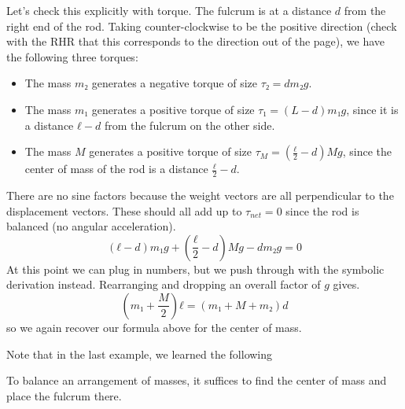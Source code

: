 \begin{example}
\begin{solution}
Let's check this explicitly with torque. The fulcrum is at a distance $d$ from the right end of the rod. Taking counter-clockwise to be the positive direction (check with the RHR that this corresponds to the direction out of the page), we have the following three torques:
\begin{itemize}
	\item The mass $m₂$ generates a negative torque of size $τ₂  = d m₂ g$. 
	\item The mass $m₁$ generates a positive torque of size $τ₁  = (L-d) m₁  g$, since it is a distance $ℓ-d$ from the fulcrum on the other side. 
	\item The mass $M$ generates a positive torque of size $τ_M  = \left(\frac ℓ2-d\right)  M  g$, since the center of mass of the rod is a distance $\frac ℓ2-d$.
\end{itemize}
There are no sine factors because the weight vectors are all perpendicular to the displacement vectors. These should all add up to $τ_{net} = 0$ since the rod is balanced (no angular acceleration).
$$
 (ℓ-d) m₁  g + \left(\frac ℓ2-d\right)  M  g- d m₂ g = 0
$$
At this point we can plug in numbers, but we push through with the symbolic derivation instead. Rearranging and dropping an overall factor of $g$ gives. 
$$
\left( m₁ + \frac M2 \right) ℓ  =  \left(m₁+  M + m₂ \right) d  
$$
so we again recover our formula above for the center of mass.
\end{solution}
\end{example}
Note that in the last example, we learned the following 
\begin{principle}
To balance an arrangement of masses, it suffices to find the center of mass and place the fulcrum there. 
\end{principle}


